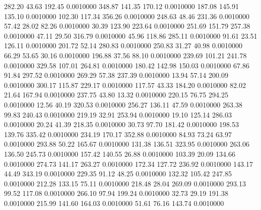  282.20   43.63  192.45   0.0010000
 348.87  141.35  170.12   0.0010000
 187.08  145.91  135.10   0.0010000
 102.30  117.34  356.26   0.0010000
 248.63   48.46  231.36   0.0010000
  57.42   28.02   82.26   0.0010000
  30.39  123.90  223.64   0.0010000
 251.69  151.79  257.38   0.0010000
  47.11   29.50  316.79   0.0010000
  45.96  118.86  285.11   0.0010000
  91.61   23.51  126.11   0.0010000
 201.72   52.14  280.83   0.0010000
 250.83   31.27   40.98   0.0010000
  66.29   53.65   30.16   0.0010000
 196.88   37.56   88.10   0.0010000
 239.69  101.21  241.78   0.0010000
 329.58  107.01  264.81   0.0010000
 180.42  142.98  150.03   0.0010000
  67.86   91.84  297.52   0.0010000
 269.29   57.38  237.39   0.0010000
  13.94   57.14  200.09   0.0010000
 300.17  115.87  229.17   0.0010000
 117.57   43.33  184.20   0.0010000
  82.02   21.64  167.94   0.0010000
 237.75   43.80   13.32   0.0010000
 220.15   76.75  294.25   0.0010000
  12.56   40.19  320.53   0.0010000
 256.27  136.11   47.59   0.0010000
 263.38   99.83  240.43   0.0010000
 219.19   32.91  253.94   0.0010000
  19.10  125.14  286.03   0.0010000
  20.24   41.39  218.35   0.0010000
  30.73   97.70  181.42   0.0010000
 198.53  139.76  335.42   0.0010000
 234.19  170.17  352.88   0.0010000
  84.93   73.24   63.97   0.0010000
 293.88   50.22  165.67   0.0010000
 131.38  136.51  323.95   0.0010000
 263.06  136.50  245.73   0.0010000
 157.42  140.55   26.88   0.0010000
 103.39   20.09  134.66   0.0010000
 274.73  141.17  263.27   0.0010000
 172.34  127.72  236.92   0.0010000
 143.17   44.49  343.19   0.0010000
 229.35   91.12   48.25   0.0010000
 132.32  105.42  247.85   0.0010000
 212.28  133.15   75.11   0.0010000
 218.48   28.04  269.09   0.0010000
 293.13   99.52  117.08   0.0010000
 266.10   97.94  199.24   0.0010000
  32.73   29.19  191.38   0.0010000
 215.99  141.60  164.03   0.0010000
  51.61   76.16  143.74   0.0010000
